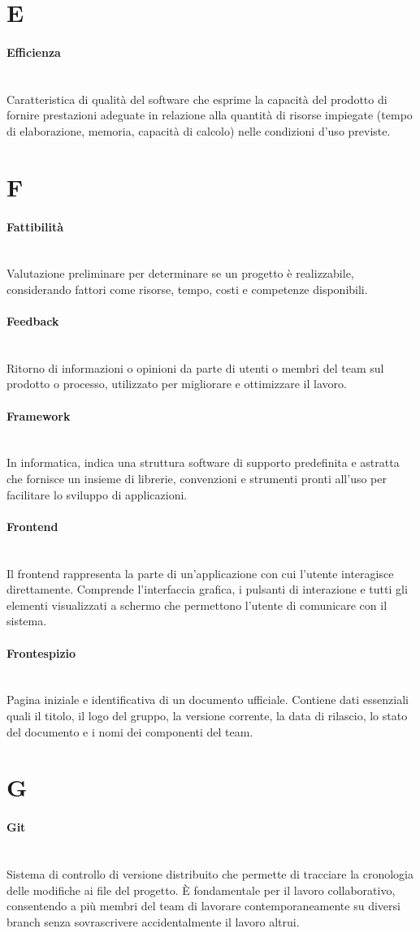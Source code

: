 \documentclass[a4paper, 10pt, colorlinks=true, linkcolor=black, urlcolor=blue, citecolor=blue, hidelinks]{article}
\newcommand{\glossaryterm}[2]{
    \paragraph{#1 \label{term:#1}} \mbox{} \\
    #2
    \vspace{0.5em}
}
\begin{document}
\newpage

\section*{E}

\glossaryterm{Efficienza}{Caratteristica di qualità del software che esprime la capacità del prodotto di fornire prestazioni adeguate in relazione alla quantità di risorse impiegate (tempo di elaborazione, memoria, capacità di calcolo) nelle condizioni d'uso previste.}

\newpage

\section*{F}

\glossaryterm{Fattibilità}{Valutazione preliminare per determinare se un progetto è realizzabile, considerando fattori come risorse, tempo, costi e competenze disponibili.}

\glossaryterm{Feedback}{Ritorno di informazioni o opinioni da parte di utenti o membri del team sul prodotto o processo, utilizzato per migliorare e ottimizzare il lavoro.}

\glossaryterm{Framework}{In informatica, indica una struttura software di supporto predefinita e astratta che fornisce un insieme di librerie, convenzioni e strumenti pronti all'uso per facilitare lo sviluppo di applicazioni.}

\glossaryterm{Frontend}{Il frontend rappresenta la parte di un'applicazione con cui l'utente interagisce direttamente. Comprende l'interfaccia grafica, i pulsanti di interazione e tutti gli elementi visualizzati a schermo che permettono l'utente di comunicare con il sistema.}

\glossaryterm{Frontespizio}{Pagina iniziale e identificativa di un documento ufficiale. Contiene dati essenziali quali il titolo, il logo del gruppo, la versione corrente, la data di rilascio, lo stato del documento e i nomi dei componenti del team.}

\newpage

\section*{G}

\glossaryterm{Git}{Sistema di controllo di versione distribuito che permette di tracciare la cronologia delle modifiche ai file del progetto. È fondamentale per il lavoro collaborativo, consentendo a più membri del team di lavorare contemporaneamente su diversi branch senza sovrascrivere accidentalmente il lavoro altrui.}
\end{document}
